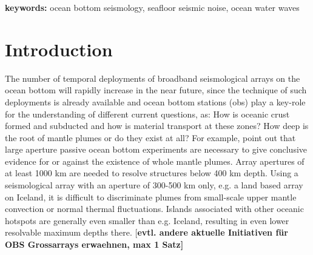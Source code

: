 \documentclass{article}
\providecommand{\chg}[1]{{\sf #1}}
\providecommand{\remark}[1]{{[\bf #1]}}
\begin{document}
{{\bf keywords:}
ocean bottom seismology, seafloor seismic noise,
ocean water waves
 
\section{Introduction}
% 
The number of temporal deployments of broadband seismological arrays on the 
ocean bottom 
will rapidly increase in the near future, since 
the technique of such deployments is already available and 
ocean bottom stations (obs) play a key-role 
for the 
understanding of different current questions, as:
How is oceanic crust formed and subducted and how is 
material transport at these zones?
How deep is the root of
mantle plumes or do they exist at all? 
For example, \cite{ritsema:03} 
point out that large aperture passive ocean bottom 
experiments are necessary to give conclusive evidence 
for or against the existence of
whole mantle plumes. 
Array apertures of at least 1000 km
are needed to resolve structures below 400 km depth.
Using a seismological array with an aperture of 300-500 km only, 
e.g. a land based array on Iceland, 
it is difficult to discriminate plumes from small-scale upper mantle
convection or normal thermal fluctuations.  
Islands associated with other oceanic hotspots are generally even smaller
than e.g. Iceland, resulting in even lower resolvable maximum depths there.
\remark{evtl. andere aktuelle Initiativen f\"ur OBS Grossarrays erwaehnen, max 1 Satz}

}
\end{document}
